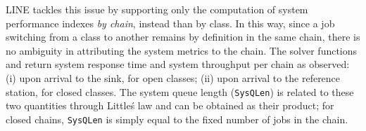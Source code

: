 LINE tackles this issue by supporting only the computation of system performance indexes {\em by chain}, instead than by class. In this way, since a job switching from a class to another remains by definition in the same chain, there is no ambiguity in attributing the system metrics to the chain.  The solver functions  and  return system response time and system throughput per chain as observed: (i) upon arrival to the sink, for open classes; (ii) upon arrival to the reference station, for closed classes. The system queue length (\texttt{SysQLen}) is related to these two quantities through Little\'s law and can be obtained as their product; for closed chains, \texttt{SysQLen} is simply equal to the fixed number of jobs in the chain.

